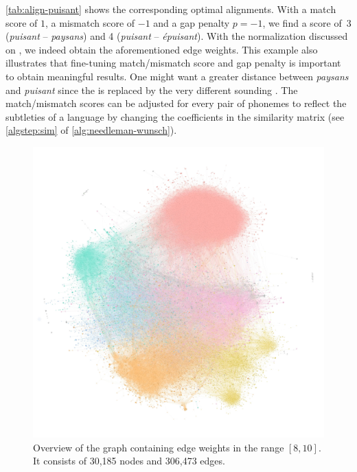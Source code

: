 \vspace{-1.5em}

\autoref{tab:align-puisant} shows the corresponding optimal alignments. With a match score of $1$, a mismatch score of $-1$ and a gap penalty $p=-1$, we find a score of~3 (\textit{puisant} -- \textit{paysans}) and 4 (\textit{puisant} -- \textit{épuisant}). With the normalization discussed on , we indeed obtain the aforementioned edge weights. This example also illustrates that fine-tuning match/mismatch score and gap penalty is important to obtain meaningful results. One might want a greater distance between \textit{paysans} and \textit{puisant} since the  is replaced by the very different sounding . The match/mismatch scores can be adjusted for every pair of phonemes to reflect the subtleties of a language by changing the coefficients in the similarity matrix (see \autoref{algstep:sim} of \autoref{alg:needleman-wunsch}).

\vspace{-0.8em}

\begin{figure}[H]
    \centering
    \includegraphics[width=\linewidth, trim=1cm 4.8cm 0.5cm 3.2cm, clip]{assets/big-view-min.jpg}
    \caption{Overview of the graph containing edge weights in the range $[8,10]$. It consists of 30,185 nodes and 306,473 edges.}
    \label{fig:big-view}
\end{figure}

